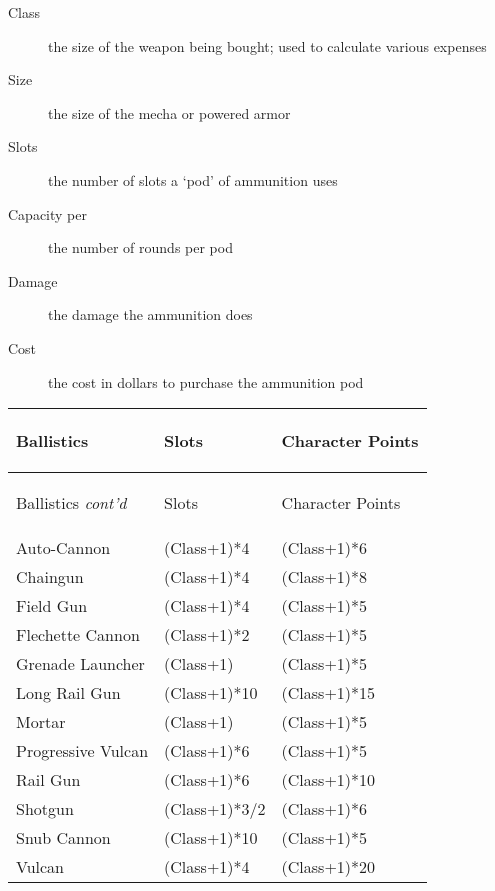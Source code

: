 \documentclass[twoside]{book}
\begin{document}
\begin{description}
    
  \item[ Class ] 
    {  
      the size of the weapon being bought; used to
                 calculate various expenses 
    }
  
  \item[ Size ] 
    {  
      the size of the mecha or powered armor 
    }
  
  \item[ Slots ] 
    {  
      the number of slots a `pod' of
                 ammunition uses 
    }
  
  \item[ Capacity per ] 
    {  
      the number of rounds per pod 
    }
  
  \item[ Damage ] 
    {  
      the damage the ammunition does 
    }
  
  \item[ Cost ] 
    {  
      the cost in dollars to purchase the ammunition
                 pod 
    }
  
\end{description}
  
\begin{longtable}{p{1.25in}ll} 
  Ballistics& \begin{turn}{70}{Slots}\end{turn}
          & \begin{turn}{70}{Character Points}\end{turn}
          \\
  \hline
  \hline
  \endfirsthead
  Ballistics \textit{cont'd}
        & \begin{turn}{70}{Slots}\end{turn}
          & \begin{turn}{70}{Character Points}\end{turn}
           \\
  \hline
  \endhead
\raggedright Auto-Cannon & (Class+1)*4 & (Class+1)*6
           \tabularnewline
      \raggedright Chaingun & (Class+1)*4 & (Class+1)*8
           \tabularnewline
      \raggedright Field Gun & (Class+1)*4 & (Class+1)*5
           \tabularnewline
      \raggedright Flechette Cannon & (Class+1)*2 & (Class+1)*5
           \tabularnewline
      \raggedright Grenade Launcher & (Class+1) & (Class+1)*5
           \tabularnewline
      \raggedright Long Rail Gun & (Class+1)*10 & (Class+1)*15
           \tabularnewline
      \raggedright Mortar & (Class+1) & (Class+1)*5
           \tabularnewline
      \raggedright Progressive Vulcan & (Class+1)*6 & (Class+1)*5
           \tabularnewline
      \raggedright Rail Gun & (Class+1)*6 & (Class+1)*10
           \tabularnewline
      \raggedright Shotgun & (Class+1)*3/2 & (Class+1)*6
           \tabularnewline
      \raggedright Snub Cannon & (Class+1)*10 & (Class+1)*5
           \tabularnewline
      \raggedright Vulcan & (Class+1)*4 & (Class+1)*20
           \tabularnewline
      
\end{longtable}
    
\end{document}
